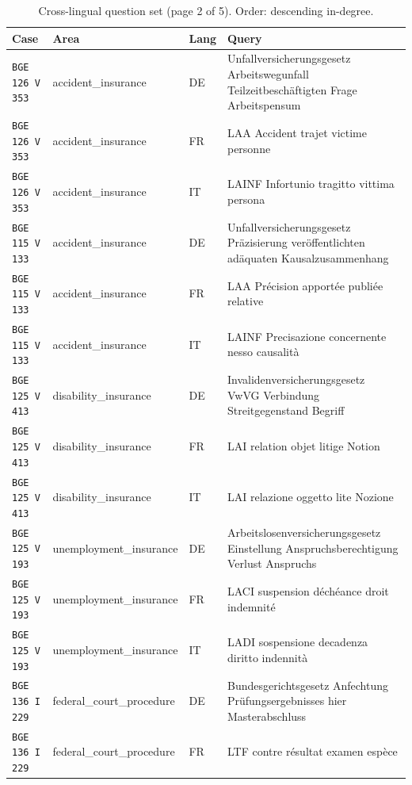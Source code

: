 \clearpage
\begin{table}[h]
\centering
\caption{Cross-lingual question set (page 2 of 5). Order: descending in-degree.}
\scriptsize
\setlength{\tabcolsep}{2pt}
\begin{tabular}{>{\raggedright\arraybackslash}p{2.2cm} >{\raggedright\arraybackslash}p{3.55cm} >{\raggedright\arraybackslash}p{0.8cm} >{\raggedright\arraybackslash}p{8.05cm}}
\toprule
\textbf{Case} & \textbf{Area} & \textbf{Lang} & \textbf{Query} \\
\midrule
\texttt{BGE 126 V 353} & accident\_insurance & DE & Unfallversicherungsgesetz Arbeitswegunfall Teilzeitbeschäftigten Frage Arbeitspensum \\
\texttt{BGE 126 V 353} & accident\_insurance & FR & LAA Accident trajet victime personne \\
\texttt{BGE 126 V 353} & accident\_insurance & IT & LAINF Infortunio tragitto vittima persona \\
\texttt{BGE 115 V 133} & accident\_insurance & DE & Unfallversicherungsgesetz Präzisierung veröffentlichten adäquaten Kausalzusammenhang \\
\texttt{BGE 115 V 133} & accident\_insurance & FR & LAA Précision apportée publiée relative \\
\texttt{BGE 115 V 133} & accident\_insurance & IT & LAINF Precisazione concernente nesso causalità \\
\texttt{BGE 125 V 413} & disability\_insurance & DE & Invalidenversicherungsgesetz VwVG Verbindung Streitgegenstand Begriff \\
\texttt{BGE 125 V 413} & disability\_insurance & FR & LAI relation objet litige Notion \\
\texttt{BGE 125 V 413} & disability\_insurance & IT & LAI relazione oggetto lite Nozione \\
\texttt{BGE 125 V 193} & unemployment\_insurance & DE & Arbeitslosenversicherungsgesetz Einstellung Anspruchsberechtigung Verlust Anspruchs \\
\texttt{BGE 125 V 193} & unemployment\_insurance & FR & LACI suspension déchéance droit indemnité \\
\texttt{BGE 125 V 193} & unemployment\_insurance & IT & LADI sospensione decadenza diritto indennità \\
\texttt{BGE 136 I 229} & federal\_court\_procedure & DE & Bundesgerichtsgesetz Anfechtung Prüfungsergebnisses hier Masterabschluss \\
\texttt{BGE 136 I 229} & federal\_court\_procedure & FR & LTF contre résultat examen espèce \\

\end{tabular}
\end{table}
